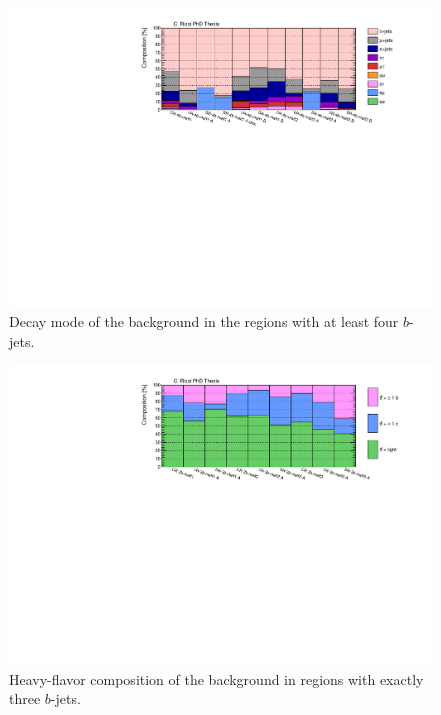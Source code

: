 \begin{figure}[htbp]
\includegraphics[width=\textwidth]{figures/ewk_prod/comp_plots/hh_4b_tt.pdf}
\caption{Decay mode of the \ttbar background in the regions with at least four $b$-jets.}
	\label{fig:ttcomp_hh4b}
\end{figure}

\begin{figure}[htbp]
\includegraphics[width=\textwidth]{figures/ewk_prod/comp_plots/hh_3b_HF.pdf}
\caption{Heavy-flavor composition of the \ttbar background in regions with exactly three $b$-jets.}
	\label{fig:HFcomp_hh3b}
\end{figure}

